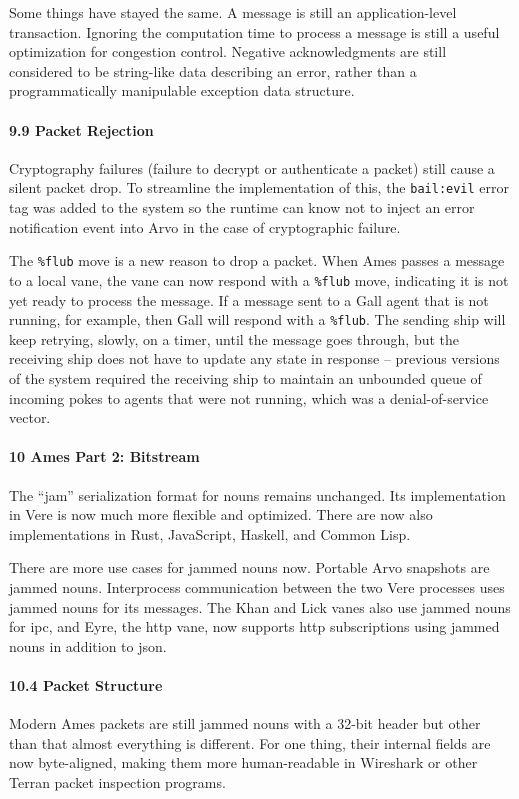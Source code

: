 \documentclass[twoside]{article}
\begin{document}
Some things have stayed the same.  A message is still an application-level transaction.  Ignoring the computation time to process a message is still a useful optimization for congestion control.  Negative acknowledgments are still considered to be string-like data describing an error, rather than a programmatically manipulable exception data structure.

\paragraph{9.9 Packet Rejection}  Cryptography failures (failure to decrypt or authenticate a packet) still cause a silent packet drop.  To streamline the implementation of this, the \lstinline[style=inlinecode]{bail:evil} error tag was added to the system so the runtime can know not to inject an error notification event into Arvo in the case of cryptographic failure.

The \lstinline[style=inlinecode]{%flub} move is a new reason to drop a packet.  When Ames passes a message to a local vane, the vane can now respond with a \lstinline[style=inlinecode]{%flub} move, indicating it is not yet ready to process the message.  If a message sent to a Gall agent that is not running, for example, then Gall will respond with a \lstinline[style=inlinecode]{%flub}.  The sending ship will keep retrying, slowly, on a timer, until the message goes through, but the receiving ship does not have to update any state in response – previous versions of the system required the receiving ship to maintain an unbounded queue of incoming pokes to agents that were not running, which was a denial-of-service vector.

\paragraph{10 Ames Part 2:  Bitstream}  The ``jam'' serialization format for nouns remains unchanged.  Its implementation in Vere is now much more flexible and optimized.  There are now also implementations in Rust, JavaScript, Haskell, and Common Lisp.

There are more use cases for jammed nouns now.  Portable Arvo snapshots are jammed nouns.  Interprocess communication between the two Vere processes uses jammed nouns for its messages.  The Khan and Lick vanes also use jammed nouns for {\sc ipc}, and Eyre, the {\sc http} vane, now supports {\sc http} subscriptions using jammed nouns in addition to {\sc json}.

\paragraph{10.4 Packet Structure}  Modern Ames packets are still jammed nouns with a 32-bit header but other than that almost everything is different.  For one thing, their internal fields are now byte-aligned, making them more human-readable in Wireshark or other Terran packet inspection programs.
\end{document}
